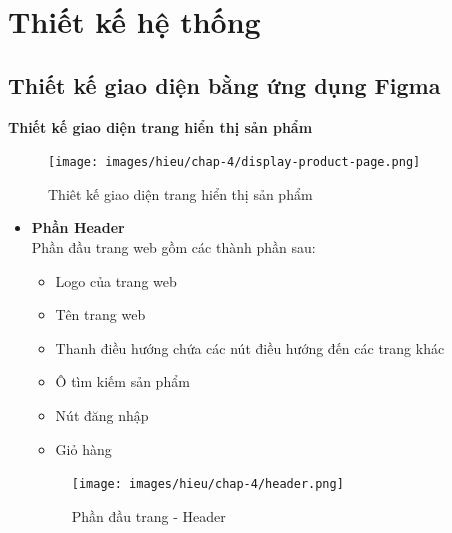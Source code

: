 \chapter{Thiết kế hệ thống}
\section{Thiết kế giao diện bằng ứng dụng Figma}
\textbf{Thiết kế giao diện trang hiển thị sản phẩm}
\begin{figure}[H]
    \begin{center}
    \texttt{[image: images/hieu/chap-4/display-product-page.png]}
    \vspace*{5mm}
    \caption{Thiêt kế giao diện trang hiển thị sản phẩm}
    \end{center}
\end{figure}
\begin{itemize}
    \item \textbf{Phần Header}
    \\[0.2cm]
    Phần đầu trang web gồm các thành phần sau:
    \begin{itemize}
        \item Logo của trang web
        \item Tên trang web
        \item Thanh điều hướng chứa các nút điều hướng đến các trang khác
        \item Ô tìm kiếm sản phẩm
        \item Nút đăng nhập
        \item Giỏ hàng
    \end{itemize}
    \begin{figure}[H]
        \begin{center}
        \texttt{[image: images/hieu/chap-4/header.png]}
        \vspace*{5mm}
        \caption{Phần đầu trang - Header}
        \end{center}
    \end{figure}


\end{itemize}
